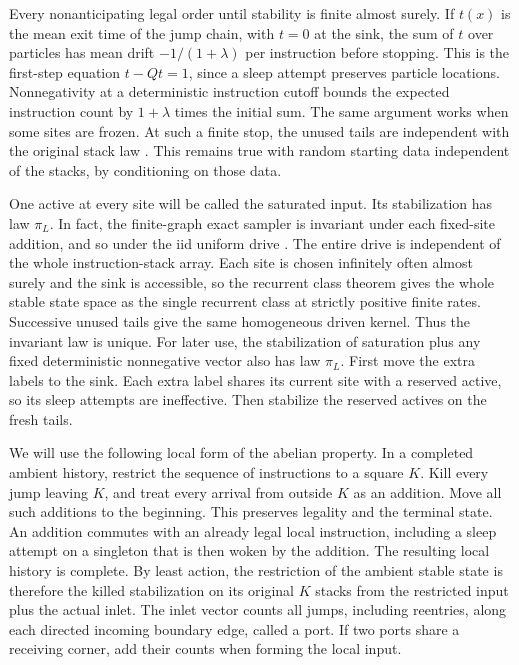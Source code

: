 \documentclass[11pt]{amsart}
\newcommand{\1}{\mathbf 1}
\begin{document}
Every nonanticipating legal order until stability is finite almost surely. If \(t(x)\) is the mean exit time of the jump chain, with \(t=0\) at the sink, the sum of \(t\) over particles has mean drift \(-1/(1+\lambda)\) per instruction before stopping. This is the first-step equation \(t-Qt=1\), since a sleep attempt preserves particle locations. Nonnegativity at a deterministic instruction cutoff bounds the expected instruction count by \(1+\lambda\) times the initial sum. The same argument works when some sites are frozen. At such a finite stop, the unused tails are independent with the original stack law \cite[Lemma~1]{LL}. This remains true with random starting data independent of the stacks, by conditioning on those data.

One active at every site will be called the saturated input. Its stabilization has law \(\pi_L\). In fact, the finite-graph exact sampler is invariant under each fixed-site addition, and so under the iid uniform drive \cite[Theorem~1]{LL}. The entire drive is independent of the whole instruction-stack array. Each site is chosen infinitely often almost surely and the sink is accessible, so the recurrent class theorem \cite[Lemma~5]{LL} gives the whole stable state space as the single recurrent class at strictly positive finite rates. Successive unused tails give the same homogeneous driven kernel. Thus the invariant law is unique. For later use, the stabilization of saturation plus any fixed deterministic nonnegative vector also has law \(\pi_L\). First move the extra labels to the sink. Each extra label shares its current site with a reserved active, so its sleep attempts are ineffective. Then stabilize the reserved actives on the fresh tails.

We will use the following local form of the abelian property. In a completed ambient history, restrict the sequence of instructions to a square \(K\). Kill every jump leaving \(K\), and treat every arrival from outside \(K\) as an addition. Move all such additions to the beginning. This preserves legality and the terminal state. An addition commutes with an already legal local instruction, including a sleep attempt on a singleton that is then woken by the addition. The resulting local history is complete. By least action, the restriction of the ambient stable state is therefore the killed stabilization on its original \(K\) stacks from the restricted input plus the actual inlet. The inlet vector counts all jumps, including reentries, along each directed incoming boundary edge, called a port. If two ports share a receiving corner, add their counts when forming the local input.
\end{document}
